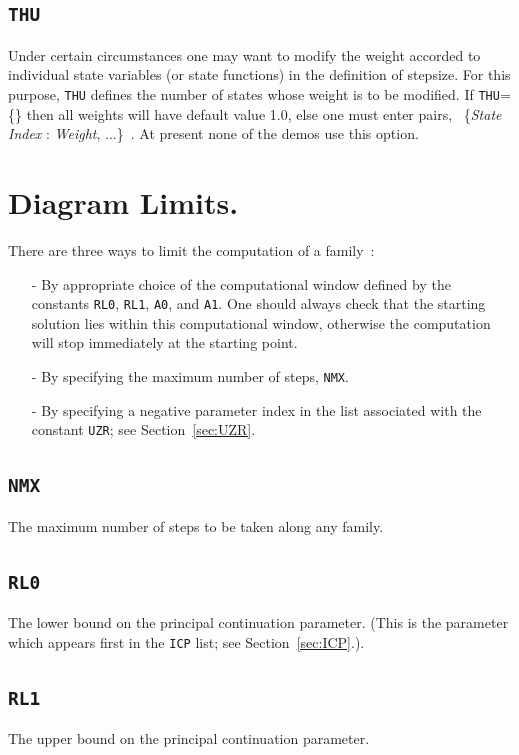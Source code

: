 \documentclass[12pt]{report}
\begin{document}
\subsection{\tt THU}  \label{sec:THU}
Under certain circumstances one may want to modify the weight accorded 
to individual state variables (or state functions) in the definition 
of stepsize.
For this purpose, {\tt THU} defines the number of states whose weight 
is to be modified.
If {\tt THU}=\{\} then all weights will have default value 1.0,
else one must enter pairs,
             ~\{{\it State Index} : {\it Weight}, ...\}~.
At present none of the demos use this option.
\section{ Diagram Limits.} \label{sec:Diagram_limits}

There are three ways to limit the computation of a family~:

\begin{itemize}
\item[-]
By appropriate choice of the computational window 
defined by the constants {\tt RL0}, {\tt RL1}, {\tt A0}, and {\tt A1}.
One should always check that the starting solution lies within
this computational window, otherwise the computation will stop immediately
at the starting point.

\item[-]
By specifying the maximum number of steps, {\tt NMX}.

\item[-]
By specifying a negative parameter index in the list associated 
with the constant {\tt UZR}; see Section~\ref{sec:UZR}. 
\end{itemize}

\subsection{\tt NMX} \label{sec:NMX}
The maximum number of steps to be taken along any family.

\subsection{\tt RL0}  \label{sec:RL0}
 The lower bound on the principal continuation parameter.
 (This is the parameter which appears first in the {\tt ICP} list;
 see Section~\ref{sec:ICP}.). 


\subsection{\tt RL1}  \label{sec:RL1}
 The upper bound on the principal continuation parameter. 
\end{document}
